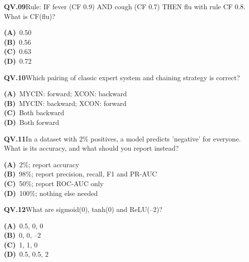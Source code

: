 \begin{tcolorbox}[enhanced,breakable,colback=white,colframe=navyL,arc=2mm,boxrule=0.7pt,left=3mm,right=3mm,top=2mm,bottom=2mm]
\textbf{\color{navy}QV.09}\quad Rule: IF fever (CF 0.9) AND cough (CF 0.7) THEN flu with rule CF 0.8. What is CF(flu)?\hfill{}\par\smallskip
{\small \textbf{\color{navyL}(A)}\ 0.50\\[1pt]\textbf{\color{navyL}(B)}\ 0.56\\[1pt]\textbf{\color{navyL}(C)}\ 0.63\\[1pt]\textbf{\color{navyL}(D)}\ 0.72}
\end{tcolorbox}
\begin{tcolorbox}[enhanced,breakable,colback=white,colframe=navyL,arc=2mm,boxrule=0.7pt,left=3mm,right=3mm,top=2mm,bottom=2mm]
\textbf{\color{navy}QV.10}\quad Which pairing of classic expert system and chaining strategy is correct?\hfill{}\par\smallskip
{\small \textbf{\color{navyL}(A)}\ MYCIN: forward; XCON: backward\\[1pt]\textbf{\color{navyL}(B)}\ MYCIN: backward; XCON: forward\\[1pt]\textbf{\color{navyL}(C)}\ Both backward\\[1pt]\textbf{\color{navyL}(D)}\ Both forward}
\end{tcolorbox}
\begin{tcolorbox}[enhanced,breakable,colback=white,colframe=navyL,arc=2mm,boxrule=0.7pt,left=3mm,right=3mm,top=2mm,bottom=2mm]
\textbf{\color{navy}QV.11}\quad In a dataset with 2\% positives, a model predicts 'negative' for everyone. What is its accuracy, and what should you report instead?\hfill{}\par\smallskip
{\small \textbf{\color{navyL}(A)}\ 2\%; report accuracy\\[1pt]\textbf{\color{navyL}(B)}\ 98\%; report precision, recall, F1 and PR-AUC\\[1pt]\textbf{\color{navyL}(C)}\ 50\%; report ROC-AUC only\\[1pt]\textbf{\color{navyL}(D)}\ 100\%; nothing else needed}
\end{tcolorbox}
\begin{tcolorbox}[enhanced,breakable,colback=white,colframe=navyL,arc=2mm,boxrule=0.7pt,left=3mm,right=3mm,top=2mm,bottom=2mm]
\textbf{\color{navy}QV.12}\quad What are sigmoid(0), tanh(0) and ReLU(--2)?\hfill{}\par\smallskip
{\small \textbf{\color{navyL}(A)}\ 0.5, 0, 0\\[1pt]\textbf{\color{navyL}(B)}\ 0, 0, --2\\[1pt]\textbf{\color{navyL}(C)}\ 1, 1, 0\\[1pt]\textbf{\color{navyL}(D)}\ 0.5, 0.5, 2}
\end{tcolorbox}
